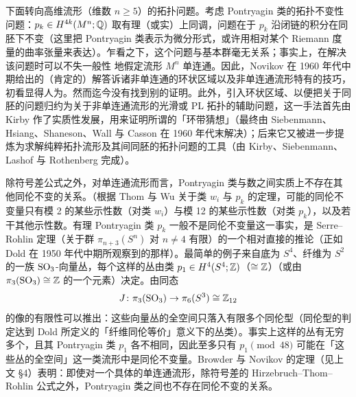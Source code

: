 
下面转向高维流形（维数 $n\ge 5$）的拓扑问题。考虑 Pontryagin 类的拓扑不变性问题：$p_{k}\in H^{4k}(M^{n};\mathbb{Q})$ 取有理（或实）上同调，问题在于 $p_{k}$ 沿闭链的积分在同胚下不变（这里把 Pontryagin 类表示为微分形式，或许用相对某个 Riemann 度量的曲率张量来表达）。乍看之下，这个问题与基本群毫无关系；事实上，在解决该问题时可以不失一般性
地假定流形 $M^{n}$ 单连通。因此，Novikov 在 1960 年代中期给出的（肯定的）解答诉诸非单连通的环状区域以及非单连通流形特有的技巧，初看显得人为。然而迄今没有找到别的证明。此外，引入环状区域、以便把关于同胚的问题归约为关于非单连通流形的光滑或 PL 拓扑的辅助问题，这一手法首先由 Kirby 作了实质性发展，用来证明所谓的「环带猜想」（最终由 Siebenmann、Hsiang、Shaneson、Wall 与 Casson 在 1960 年代末解决）；后来它又被进一步提炼为求解纯粹拓扑流形及其间同胚的拓扑问题的工具（由 Kirby、Siebenmann、Lashof 与 Rothenberg 完成）。

除符号差公式之外，对单连通流形而言，Pontryagin 类与数之间实质上不存在其他同伦不变的关系。（根据 Thom 与 Wu 关于类 $w_{i}$ 与 $p_{k}$ 的定理，可能的同伦不变量只有模 2 的某些示性数（对类 $w_{i}$）与模 12 的某些示性数（对类 $p_{k}$），以及若干其他示性数。有理 Pontryagin 类 $p_{k}$ 一般不是同伦不变量这一事实，是 Serre--Rohlin 定理（关于群 $\pi_{n+3}(S^{n})$ 对 $n\neq 4$ 有限）的一个相对直接的推论（正如 Dold 在 1950 年代中期所观察到的那样）。最简单的例子来自底为 $S^{4}$、纤维为 $S^{2}$ 的一族 $\mathrm{SO}_{3}$-向量丛，每个这样的丛由类 $p_{1}\in H^{4}(S^{4};\mathbb{Z})$（$\cong\mathbb{Z}$）（或由 $\pi_{3}(\mathrm{SO}_{3})\cong\mathbb{Z}$ 的一个元素）决定。由同态
\[
J\colon\pi_{3}(\mathrm{SO}_{3})\to\pi_{6}(S^{3})\cong\mathbb{Z}_{12}
\]
的像的有限性可以推出：这些向量丛的全空间只落入有限多个同伦型（同伦型的判定达到 Dold 所定义的「纤维同伦等价」意义下的丛类）。事实上这样的丛有无穷多个，且其 Pontryagin 类 $p_{1}$ 各不相同，因此至多只有 $p_{1}\pmod{48}$ 可能在「这些丛的全空间」这一类流形中是同伦不变量。Browder 与 Novikov 的定理（见上文 §4）表明：即使对一个具体的单连通流形，除符号差的 Hirzebruch--Thom--Rohlin 公式之外，Pontryagin 类之间也不存在同伦不变的关系。


